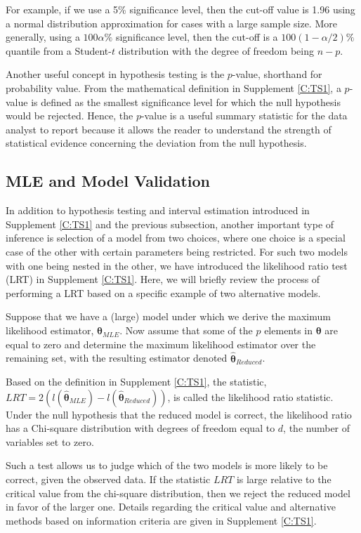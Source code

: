 \documentclass[]{book}
\theoremstyle{definition}
\theoremstyle{definition}
\theoremstyle{definition}
\theoremstyle{remark}
\begin{document}
For example, if we use a 5\% significance level, then the cut-off value
is 1.96 using a normal distribution approximation for cases with a large
sample size. More generally, using a \(100 \alpha \%\) significance
level, then the cut-off is a \(100(1-\alpha/2)\%\) quantile from a
Student-\(t\) distribution with the degree of freedom being \(n-p\).

Another useful concept in hypothesis testing is the \(p\)-value,
shorthand for probability value. From the mathematical definition in
Supplement \ref{C:TS1}, a \(p\)-value is defined as the smallest
significance level for which the null hypothesis would be rejected.
Hence, the \(p\)-value is a useful summary statistic for the data
analyst to report because it allows the reader to understand the
strength of statistical evidence concerning the deviation from the null
hypothesis.

\subsection{MLE and Model Validation}\label{mle-and-model-validation}

In addition to hypothesis testing and interval estimation introduced in
Supplement \ref{C:TS1} and the previous subsection, another important
type of inference is selection of a model from two choices, where one
choice is a special case of the other with certain parameters being
restricted. For such two models with one being nested in the other, we
have introduced the likelihood ratio test (LRT) in Supplement
\ref{C:TS1}. Here, we will briefly review the process of performing a
LRT based on a specific example of two alternative models.

Suppose that we have a (large) model under which we derive the maximum
likelihood estimator, \(\hat{\boldsymbol{\theta}}_{MLE}\). Now assume
that some of the \(p\) elements in \(\boldsymbol \theta\) are equal to
zero and determine the maximum likelihood estimator over the remaining
set, with the resulting estimator denoted
\(\hat{\boldsymbol{\theta}}_{Reduced}\).

Based on the definition in Supplement \ref{C:TS1}, the statistic,
\(LRT= 2 \left( l(\hat{\boldsymbol{\theta}}_{MLE}) - l(\hat{\boldsymbol{\theta}}_{Reduced}) \right)\),
is called the likelihood ratio statistic. Under the null hypothesis that
the reduced model is correct, the likelihood ratio has a Chi-square
distribution with degrees of freedom equal to \(d\), the number of
variables set to zero.

Such a test allows us to judge which of the two models is more likely to
be correct, given the observed data. If the statistic \(LRT\) is large
relative to the critical value from the chi-square distribution, then we
reject the reduced model in favor of the larger one. Details regarding
the critical value and alternative methods based on information criteria
are given in Supplement \ref{C:TS1}.


\end{document}
